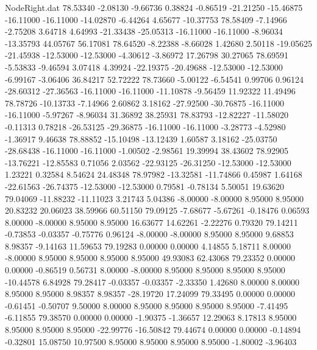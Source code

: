\begin{filecontents}{NodeRight.dat}
  78.53340   -2.08130   -9.66736     0.38824   -0.86519  -21.21250  -15.46875  -16.11000  -16.11000  -14.02870   -6.44264    4.65677  -10.37753
  78.58409   -7.14966   -2.75208     3.64718    4.64993  -21.33438  -25.05313  -16.11000  -16.11000   -8.96034  -13.35793   44.05767   56.17081
  78.64520   -8.22388   -8.66028     1.42680    2.50118  -19.05625  -21.45938  -12.53000  -12.53000   -4.30612   -3.86972   17.26798   30.27065
  78.69591   -5.53833   -9.46594     3.07418    4.39924  -22.19375  -20.49688  -12.53000  -12.53000   -6.99167   -3.06406   36.84217   52.72222
  78.73660   -5.00122   -6.54541     0.99706    0.96124  -28.60312  -27.36563  -16.11000  -16.11000  -11.10878   -9.56459   11.92322   11.49496
  78.78726  -10.13733   -7.14966     2.60862    3.18162  -27.92500  -30.76875  -16.11000  -16.11000   -5.97267   -8.96034   31.36892   38.25931
  78.83793  -12.82227  -11.58020    -0.11313    0.78218  -26.53125  -29.36875  -16.11000  -16.11000   -3.28773   -4.52980   -1.36917    9.46638
  78.88852  -15.10498  -13.12439     1.60587    3.18162  -25.03750  -28.68438  -16.11000  -16.11000   -1.00502   -2.98561   19.39994   38.43602
  78.92905  -13.76221  -12.85583     0.71056    2.03562  -22.93125  -26.31250  -12.53000  -12.53000    1.23221    0.32584    8.54624   24.48348
  78.97982  -13.32581  -11.74866     0.45987    1.64168  -22.61563  -26.74375  -12.53000  -12.53000    0.79581   -0.78134    5.50051   19.63620
  79.04069  -11.88232  -11.11023     3.21743    5.04386   -8.00000   -8.00000    8.95000    8.95000   20.83232   20.06023   38.59966   60.51150
  79.09125   -7.68677   -5.67261    -0.18476    0.06593    8.00000   -8.00000    8.95000    8.95000   16.63677   14.62261   -2.22276    0.79320
  79.14211   -0.73853   -0.03357    -0.75776    0.96124   -8.00000   -8.00000    8.95000    8.95000    9.68853    8.98357   -9.14163   11.59653
  79.19283    0.00000    0.00000     4.14855    5.18711    8.00000   -8.00000    8.95000    8.95000    8.95000    8.95000   49.93083   62.43068
  79.23352    0.00000    0.00000    -0.86519    0.56731    8.00000   -8.00000    8.95000    8.95000    8.95000    8.95000  -10.44578    6.84928
  79.28417   -0.03357   -0.03357    -2.33350    1.42680    8.00000    8.00000    8.95000    8.95000    8.98357    8.98357  -28.19720   17.24099
  79.33495    0.00000    0.00000    -0.61451   -0.50707    9.50000    8.00000    8.95000    8.95000    8.95000    8.95000   -7.41495   -6.11855
  79.38570    0.00000    0.00000    -1.90375   -1.36657   12.29063    8.17813    8.95000    8.95000    8.95000    8.95000  -22.99776  -16.50842
  79.44674    0.00000    0.00000    -0.14894   -0.32801   15.08750   10.97500    8.95000    8.95000    8.95000    8.95000   -1.80002   -3.96403

\end{filecontents}
